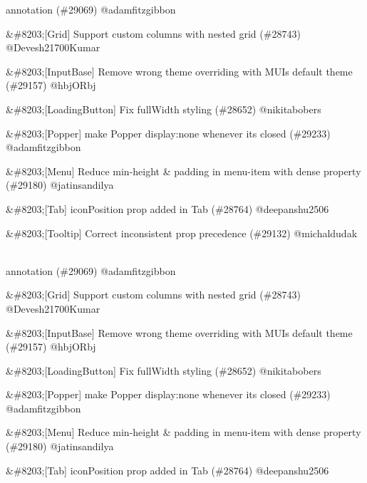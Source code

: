 \begin{DoxyRefList}
\label{deprecated__deprecated000004}%
%
annotation (\#29069) @adamfitzgibbon
\begin{DoxyItemize}
\item \&\#8203;\mbox{[}Grid\mbox{]} Support custom columns with nested grid (\#28743) @\+Devesh21700\+Kumar
\item \&\#8203;\mbox{[}Input\+Base\mbox{]} Remove wrong theme overriding with MUI\textquotesingle{}s default theme (\#29157) @hbj\+ORbj
\item \&\#8203;\mbox{[}Loading\+Button\mbox{]} Fix {\ttfamily full\+Width} styling (\#28652) @nikitabobers
\item \&\#8203;\mbox{[}Popper\mbox{]} make Popper display\+:none whenever it\textquotesingle{}s closed (\#29233) @adamfitzgibbon
\item \&\#8203;\mbox{[}Menu\mbox{]} Reduce min-\/height \& padding in menu-\/item with dense property (\#29180) @jatinsandilya
\item \&\#8203;\mbox{[}Tab\mbox{]} {\ttfamily icon\+Position} prop added in Tab (\#28764) @deepanshu2506
\item \&\#8203;\mbox{[}Tooltip\mbox{]} Correct inconsistent prop precedence (\#29132) @michaldudak
\end{DoxyItemize}
\item[Page \doxylink{md__c_1_2_users_2saket_2_one_drive_2_desktop_2e_pathshala_2epathshala-_web_2node__modules_2_0dmui_2system_2_c_h_a_n_g_e_l_o_g}{Versions} ]\hfill \\
\label{deprecated__deprecated000005}%
%
annotation (\#29069) @adamfitzgibbon
\begin{DoxyItemize}
\item \&\#8203;\mbox{[}Grid\mbox{]} Support custom columns with nested grid (\#28743) @\+Devesh21700\+Kumar
\item \&\#8203;\mbox{[}Input\+Base\mbox{]} Remove wrong theme overriding with MUI\textquotesingle{}s default theme (\#29157) @hbj\+ORbj
\item \&\#8203;\mbox{[}Loading\+Button\mbox{]} Fix {\ttfamily full\+Width} styling (\#28652) @nikitabobers
\item \&\#8203;\mbox{[}Popper\mbox{]} make Popper display\+:none whenever it\textquotesingle{}s closed (\#29233) @adamfitzgibbon
\item \&\#8203;\mbox{[}Menu\mbox{]} Reduce min-\/height \& padding in menu-\/item with dense property (\#29180) @jatinsandilya
\item \&\#8203;\mbox{[}Tab\mbox{]} {\ttfamily icon\+Position} prop added in Tab (\#28764) @deepanshu2506

\end{DoxyItemize}
\end{DoxyRefList}
